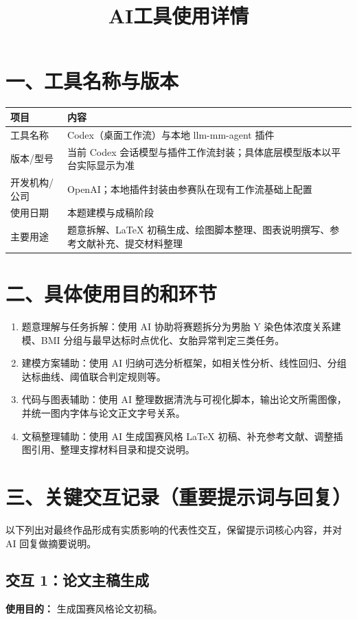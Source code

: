\documentclass[12pt,a4paper]{article}
\title{\heiti AI工具使用详情}
\date{}
\begin{document}
\maketitle

\section*{一、工具名称与版本}
\begin{longtable}{>{\raggedright\arraybackslash}m{3.2cm} m{10cm}}
\toprule
项目 & 内容 \\
\midrule
工具名称 & Codex（桌面工作流）与本地 llm-mm-agent 插件 \\
版本/型号 & 当前 Codex 会话模型与插件工作流封装；具体底层模型版本以平台实际显示为准 \\
开发机构/公司 & OpenAI；本地插件封装由参赛队在现有工作流基础上配置 \\
使用日期 & 本题建模与成稿阶段 \\
主要用途 & 题意拆解、\LaTeX{} 初稿生成、绘图脚本整理、图表说明撰写、参考文献补充、提交材料整理 \\
\bottomrule
\end{longtable}

\section*{二、具体使用目的和环节}
\begin{enumerate}
    \item 题意理解与任务拆解：使用 AI 协助将赛题拆分为男胎 Y 染色体浓度关系建模、BMI 分组与最早达标时点优化、女胎异常判定三类任务。
    \item 建模方案辅助：使用 AI 归纳可选分析框架，如相关性分析、线性回归、分组达标曲线、阈值联合判定规则等。
    \item 代码与图表辅助：使用 AI 整理数据清洗与可视化脚本，输出论文所需图像，并统一图内字体与论文正文字号关系。
    \item 文稿整理辅助：使用 AI 生成国赛风格 \LaTeX{} 初稿、补充参考文献、调整插图引用、整理支撑材料目录和提交说明。
\end{enumerate}

\section*{三、关键交互记录（重要提示词与回复）}
以下列出对最终作品形成有实质影响的代表性交互，保留提示词核心内容，并对 AI 回复做摘要说明。

\subsection*{交互 1：论文主稿生成}
\textbf{使用目的：} 生成国赛风格论文初稿。
\end{document}

